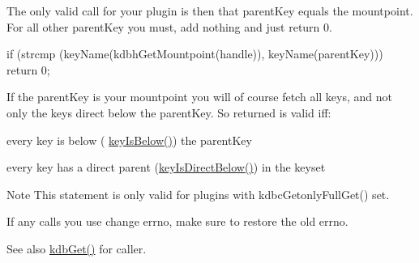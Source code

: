 The only valid call for your plugin is then that {\ttfamily parentKey} equals the {\ttfamily mountpoint}. For all other {\ttfamily parentKey} you must, add nothing and just return 0.


\begin{DoxyCode}
if (strcmp (keyName(kdbhGetMountpoint(handle)), keyName(parentKey))) return 0;
\end{DoxyCode}


If the {\ttfamily parentKey} is your mountpoint you will of course fetch all keys, and not only the keys direct below the {\ttfamily parentKey}. So {\ttfamily returned} is valid iff:
\begin{DoxyItemize}
\item every key is below ( \hyperlink{group__keytest_ga03332b5d97c76a4fd2640aca4762b8df}{keyIsBelow()}) the parentKey
\item every key has a direct parent (\hyperlink{group__keytest_ga4f175aafd98948ce6c774f3bd92b72ca}{keyIsDirectBelow()}) in the keyset
\end{DoxyItemize}

\begin{DoxyNote}{Note}
This statement is only valid for plugins with kdbcGetonlyFullGet() set.

If any calls you use change errno, make sure to restore the old errno.
\end{DoxyNote}
\begin{DoxySeeAlso}{See also}
\hyperlink{group__kdb_ga28e385fd9cb7ccfe0b2f1ed2f62453a1}{kdbGet()} for caller.
\end{DoxySeeAlso}

